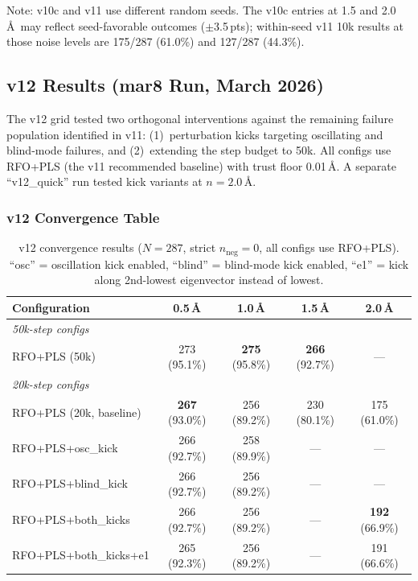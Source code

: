 \documentclass[11pt,a4paper]{article}
\theoremstyle{definition}
\begin{document}
Note: v10c and v11 use different random seeds.  The v10c entries at 1.5 and
2.0\,\AA\ may reflect seed-favorable outcomes ($\pm$3.5\,pts); within-seed
v11 10k results at those noise levels are 175/287 (61.0\%) and 127/287
(44.3\%).

\subsection{v12 Results (mar8 Run, March 2026)}
\label{sec:v12}

The v12 grid tested two orthogonal interventions against the remaining
failure population identified in v11: (1)~perturbation kicks targeting
oscillating and blind-mode failures, and (2)~extending the step budget
to 50k.  All configs use RFO+PLS (the v11 recommended baseline) with
trust floor 0.01\,\AA.  A separate ``v12\_quick'' run tested kick variants
at $n=2.0$\,\AA.

\subsubsection{v12 Convergence Table}
\label{sec:v12-table}

\begin{table}[h]
\centering
\caption{v12 convergence results ($N=287$, strict $n_\text{neg}=0$, all
  configs use RFO+PLS).  ``osc'' = oscillation kick enabled,
  ``blind'' = blind-mode kick enabled, ``e1'' = kick along 2nd-lowest
  eigenvector instead of lowest.}
\label{tab:v12}
\begin{tabular}{lcccc}
\toprule
Configuration & 0.5\,\AA & 1.0\,\AA & 1.5\,\AA & 2.0\,\AA \\
\midrule
\multicolumn{5}{l}{\emph{50k-step configs}} \\
RFO+PLS (50k)          & 273 (95.1\%) & \textbf{275} (95.8\%) & \textbf{266} (92.7\%) & --- \\
\midrule
\multicolumn{5}{l}{\emph{20k-step configs}} \\
RFO+PLS (20k, baseline) & \textbf{267} (93.0\%) & 256 (89.2\%) & 230 (80.1\%) & 175 (61.0\%) \\
RFO+PLS+osc\_kick       & 266 (92.7\%) & 258 (89.9\%) & ---          & --- \\
RFO+PLS+blind\_kick     & 266 (92.7\%) & 256 (89.2\%) & ---          & --- \\
RFO+PLS+both\_kicks     & 266 (92.7\%) & 256 (89.2\%) & ---          & \textbf{192} (66.9\%) \\
RFO+PLS+both\_kicks+e1  & 265 (92.3\%) & 256 (89.2\%) & ---          & 191 (66.6\%) \\
\bottomrule
\end{tabular}
\end{table}
\end{document}
